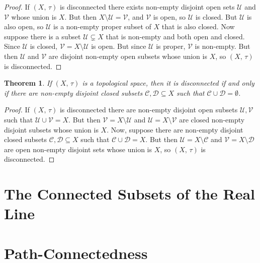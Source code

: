 \documentclass{article}
\theoremstyle{plain}
\newtheorem{theorem}{Theorem}[section]
\theoremstyle{normal}
\begin{document}
        \begin{proof}
            If $(X,\,\tau)$ is disconnected there exists non-empty disjoint
            open sets $\mathcal{U}$ and $\mathcal{V}$ whose union is $X$. But
            then $X\setminus\mathcal{U}=\mathcal{V}$, and $\mathcal{V}$ is
            open, so $\mathcal{U}$ is closed. But $\mathcal{U}$ is also open,
            so $\mathcal{U}$ is a non-empty proper subset of $X$ that is also
            closed. Now suppose there is a subset $\mathcal{U}\subsetneq{X}$
            that is non-empty and both open and closed. Since $\mathcal{U}$ is
            closed, $\mathcal{V}=X\setminus\mathcal{U}$ is open. But since
            $\mathcal{U}$ is proper, $\mathcal{V}$ is non-empty. But then
            $\mathcal{U}$ and $\mathcal{V}$ are disjoint non-empty open subsets
            whose union is $X$, so $(X,\,\tau)$ is disconnected.
        \end{proof}
        \begin{theorem}
            If $(X,\,\tau)$ is a topological space, then it is disconnected if
            and only if there are non-empty disjoint closed subsets
            $\mathcal{C},\mathcal{D}\subseteq{X}$ such that
            $\mathcal{C}\cup\mathcal{D}=\emptyset$.
        \end{theorem}
        \begin{proof}
            If $(X,\,\tau)$ is disconnected there are non-empty disjoint open
            subsets $\mathcal{U},\mathcal{V}$ such that
            $\mathcal{U}\cup\mathcal{V}=X$. But then
            $\mathcal{V}=X\setminus\mathcal{U}$ and
            $\mathcal{U}=X\setminus\mathcal{V}$ are closed non-empty disjoint
            subsets whose union is $X$. Now, suppose there are non-empty
            disjoint closed subsets $\mathcal{C},\mathcal{D}\subseteq{X}$ such
            that $\mathcal{C}\cup\mathcal{D}=X$. But then
            $\mathcal{U}=X\setminus\mathcal{C}$ and
            $\mathcal{V}=X\setminus\mathcal{D}$ are open non-empty disjoint
            sets whose union is $X$, so $(X,\,\tau)$ is disconnected.
        \end{proof}
    \section{The Connected Subsets of the Real Line}
    \section{Path-Connectedness}
\end{document}
